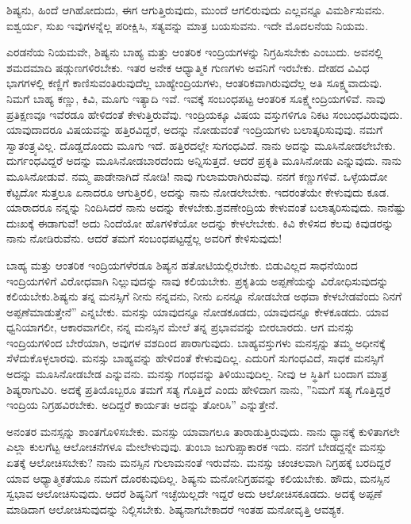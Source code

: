 ಶಿಷ್ಯನು, ಹಿಂದೆ ಆಗಿಹೋದುದು, ಈಗ ಆಗುತ್ತಿರುವುದು, ಮುಂದೆ ಆಗಲಿರುವುದು ಎಲ್ಲವನ್ನೂ ವಿಮರ್ಶಿಸುವನು. ಐಶ್ವರ್ಯ, ಸುಖ ಇವುಗಳನ್ನೆಲ್ಲ ಪರೀಕ್ಷಿಸಿ, ಸತ್ಯವನ್ನು ಮಾತ್ರ ಬಯಸುವನು. ಇದೇ ಮೊದಲನೆಯ ನಿಯಮ.

ಎರಡನೆಯ ನಿಯಮವೇ, ಶಿಷ್ಯನು ಬಾಹ್ಯ ಮತ್ತು ಆಂತರಿಕ ಇಂದ್ರಿಯಗಳನ್ನು ನಿಗ್ರಹಿಸಬೇಕು ಎಂಬುದು. ಅವನಲ್ಲಿ ಶಮದಮಾದಿ ಷಡ್ಗುಣಗಳಿರಬೇಕು. ಇತರ ಅನೇಕ ಆಧ್ಯಾತ್ಮಿಕ ಗುಣಗಳು ಅವನಿಗೆ ಇರಬೇಕು. ದೇಹದ ವಿವಿಧ ಭಾಗಗಳಲ್ಲಿ ಕಣ್ಣಿಗೆ ಕಾಣಿಸುವಂತಿರುವುದೆಲ್ಲ ಬಾಹ್ಯೇಂದ್ರಿಯಗಳು, ಆಂತರಿಕವಾಗಿರುವುದೆಲ್ಲ ಅತಿ ಸೂಕ್ಷ್ಮವಾದುವು. ನಿಮಗೆ ಬಾಹ್ಯ ಕಣ್ಣು, ಕಿವಿ, ಮೂಗು ಇತ್ಯಾದಿ ಇವೆ. ಇವಕ್ಕೆ ಸಂಬಂಧಪಟ್ಟ ಆಂತರಿಕ ಸೂಕ್ಷ್ಮೇಂದ್ರಿಯಗಳಿವೆ. ನಾವು ಪ್ರತಿಕ್ಷಣವೂ ಇವೆರಡೂ ಹೇಳಿದಂತೆ ಕೇಳುತ್ತಿರುವೆವು. ಇಂದ್ರಿಯಕ್ಕೂ ವಿಷಯ ವಸ್ತುಗಳಿಗೂ ನಿಕಟ ಸಂಬಂಧವಿರುವುದು. ಯಾವುದಾದರೂ ವಿಷಯವನ್ನು ಹತ್ತಿರವಿದ್ದರೆ, ಅದನ್ನು ನೋಡುವಂತೆ ಇಂದ್ರಿಯಗಳು ಬಲಾತ್ಕರಿಸುವುವು. ನಮಗೆ ಸ್ವಾತಂತ್ರ್ಯವಿಲ್ಲ. ದೊಡ್ಡದೊಂದು ಮೂಗು ಇದೆ. ಹತ್ತಿರದಲ್ಲೇ ಸುಗಂಧವಿದೆ. ನಾನು ಅದನ್ನು ಮೂಸಿನೋಡಲೇಬೇಕು. ದುರ್ಗಂಧವಿದ್ದರೆ ಅದನ್ನು ಮೂಸಿನೋಡಬಾರದೆಂದು ಅನ್ನಿಸುತ್ತದೆ. ಆದರೆ ಪ್ರಕೃತಿ ಮೂಸಿನೋಡು ಎನ್ನುವುದು. ನಾನು ಮೂಸಿನೋಡುವೆ. ನಮ್ಮ ಪಾಡೇನಾಗಿದೆ ನೋಡಿ! ನಾವು ಗುಲಾಮರಾಗಿರುವೆವು. ನನಗೆ ಕಣ್ಣುಗಳಿವೆ. ಒಳ್ಳೆಯದೋ ಕೆಟ್ಟದೋ ಸುತ್ತಲೂ ಏನಾದರೂ ಆಗುತ್ತಿರಲಿ, ಅದನ್ನು ನಾನು ನೋಡಲೇಬೇಕು. ಇದರಂತೆಯೇ ಕೇಳುವುದು ಕೂಡ. ಯಾರಾದರೂ ನನ್ನನ್ನು ನಿಂದಿಸಿದರೆ ನಾನು ಅದನ್ನು ಕೇಳಬೇಕು.\break ಶ್ರವಣೇಂದ್ರಿಯ ಕೇಳುವಂತೆ ಬಲಾತ್ಕರಿಸುವುದು. ನಾನೆಷ್ಟು ದುಃಖಕ್ಕೆ ಈಡಾಗುವೆ! ಅದು ನಿಂದೆಯೋ ಹೊಗಳಿಕೆಯೋ ಅದನ್ನು ಕೇಳಲೇಬೇಕು. ಕಿವಿ ಕೇಳಿಸದ ಕೆಲವು ಕಿವುಡರನ್ನು ನಾನು ನೋಡಿರುವೆನು. ಆದರೆ ತಮಗೆ ಸಂಬಂಧಪಟ್ಟದ್ದೆಲ್ಲ ಅವರಿಗೆ ಕೇಳಿಸುವುದು!

ಬಾಹ್ಯ ಮತ್ತು ಆಂತರಿಕ ಇಂದ್ರಿಯಗಳೆರಡೂ ಶಿಷ್ಯನ ಹತೋಟಿಯಲ್ಲಿರಬೇಕು. ಬಿಡುವಿಲ್ಲದ ಸಾಧನೆಯಿಂದ ಇಂದ್ರಿಯಗಳಿಗೆ ವಿರೋಧವಾಗಿ ನಿಲ್ಲುವುದನ್ನು ನಾವು ಕಲಿಯಬೇಕು. ಪ್ರಕೃತಿಯ ಅಪ್ಪಣೆಯನ್ನು ವಿರೋಧಿಸುವುದನ್ನು ಕಲಿಯಬೇಕು.\break ಶಿಷ್ಯನು ತನ್ನ ಮನಸ್ಸಿಗೆ ನೀನು ನನ್ನವನು, ನೀನು ಏನನ್ನೂ ನೋಡಬೇಡ ಅಥವಾ ಕೇಳಬೇಡವೆಂದು ನಿನಗೆ ಅಪ್ಪಣೆಮಾಡುತ್ತೇನೆ'' ಎನ್ನಬೇಕು. ಮನಸ್ಸು ಯಾವುದನ್ನೂ ನೋಡಕೂಡದು, ಯಾವುದನ್ನೂ ಕೇಳಕೂಡದು. ಯಾವ ಧ್ವನಿಯಾಗಲೀ, ಆಕಾರವಾಗಲೀ, ನನ್ನ ಮನಸ್ಸಿನ ಮೇಲೆ ತನ್ನ ಪ್ರಭಾವವನ್ನು ಬೀರಬಾರದು. ಆಗ ಮನಸ್ಸು ಇಂದ್ರಿಯಗಳಿಂದ ಬೇರೆಯಾಗಿ, ಅವುಗಳ ವಶದಿಂದ ಪಾರಾಗುವುದು. ಬಾಹ್ಯವಸ್ತುಗಳು ಮನಸ್ಸನ್ನು ತಮ್ಮ ಅಧೀನಕ್ಕೆ ಸೆಳೆದುಕೊಳ್ಳಲಾರವು. ಮನಸ್ಸು ಬಾಹ್ಯವನ್ನು ಹೇಳಿದಂತೆ ಕೇಳುವುದಿಲ್ಲ. ಎದುರಿಗೆ ಸುಗಂಧವಿದೆ, ಸಾಧಕ ಮನಸ್ಸಿಗೆ ಅದನ್ನು ಮೂಸಿನೋಡಬೇಡ ಎನ್ನುವನು. ಮನಸ್ಸು ಗಂಧವನ್ನು ತಿಳಿಯುವುದಿಲ್ಲ. ನೀವು ಆ ಸ್ಥಿತಿಗೆ ಬಂದಾಗ ಮಾತ್ರ ಶಿಷ್ಯರಾಗುವಿರಿ. ಅದಕ್ಕೆ ಪ್ರತಿಯೊಬ್ಬರೂ ತಮಗೆ ಸತ್ಯ ಗೊತ್ತಿದೆ ಎಂದು ಹೇಳಿದಾಗ ನಾನು, ''ನಿಮಗೆ ಸತ್ಯ ಗೊತ್ತಿದ್ದರೆ ಇಂದ್ರಿಯ ನಿಗ್ರಹವಿರಬೇಕು. ಅದಿದ್ದರೆ ಕಾರ್ಯತಃ ಅದನ್ನು ತೋರಿಸಿ” ಎನ್ನುತ್ತೇನೆ.

ಅನಂತರ ಮನಸ್ಸನ್ನು ಶಾಂತಗೊಳಿಸಬೇಕು. ಮನಸ್ಸು ಯಾವಾಗಲೂ ತಾರಾಡುತ್ತಿರುವುದು. ನಾನು ಧ್ಯಾನಕ್ಕೆ ಕುಳಿತಾಗಲೇ ಎಲ್ಲಾ ಕುಲಗೆಟ್ಟ ಆಲೋಚನೆಗಳೂ ಮೇಲೇಳುವುವು. ತುಂಬಾ ಜುಗುಪ್ಸಾಕಾರಕ ಇದು. ನನಗೆ ಬೇಡದ್ದನ್ನೇ ಮನಸ್ಸು ಏತಕ್ಕೆ ಆಲೋಚಿಸಬೇಕು? ನಾನು ಮನಸ್ಸಿನ ಗುಲಾಮನಂತೆ ಇರುವೆನು. ಮನಸ್ಸು ಚಂಚಲವಾಗಿ ನಿಗ್ರಹಕ್ಕೆ ಬರದಿದ್ದರೆ ಯಾವ ಆಧ್ಯಾತ್ಮಿಕತೆಯೂ ನಮಗೆ ದೊರಕುವುದಿಲ್ಲ. ಶಿಷ್ಯನು ಮನೋನಿಗ್ರಹವನ್ನು ಕಲಿಯಬೇಕು. ಹೌದು, ಮನಸ್ಸಿನ ಸ್ವಭಾವ ಆಲೋಚಿಸುವುದು. ಆದರೆ ಶಿಷ್ಯನಿಗೆ ಇಚ್ಛೆಯಿಲ್ಲದೇ ಇದ್ದರೆ ಅದು ಆಲೋಚಿಸಕೂಡದು. ಅದಕ್ಕೆ ಅಪ್ಪಣೆ ಮಾಡಿದಾಗ ಆಲೋಚಿಸುವುದನ್ನು ನಿಲ್ಲಿಸಬೇಕು. ಶಿಷ್ಯನಾಗಬೇಕಾದರೆ ಇಂತಹ ಮನೋವೃತ್ತಿ ಆವಶ್ಯಕ.

